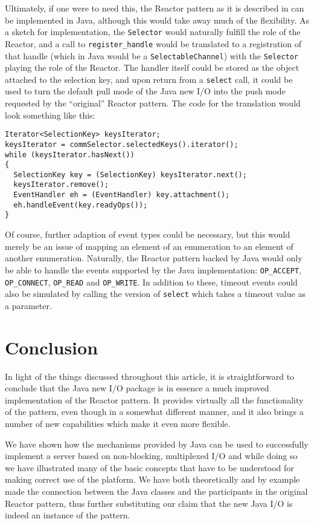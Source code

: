 \documentclass[a4paper,10pt]{article}
\begin{document}
Ultimately, if one were to need this, the Reactor pattern as it is described in \cite{218705} can be implemented
in Java, although this would take away much of the flexibility. As a sketch for implementation, the \texttt{Selector}
would naturally fulfill the role of the Reactor, and a call to \texttt{register\_handle} would be translated to a
registration of that handle (which in Java would be a \texttt{SelectableChannel}) with the \texttt{Selector}
playing the role of the Reactor. The handler itself could be stored as the object attached to the selection key,
and upon return from a \texttt{select} call, it could be used to turn the default pull mode of the Java new I/O
into the push mode requested by the ``original'' Reactor pattern. The code for the translation would look something
like this:

\begin{lstlisting}
Iterator<SelectionKey> keysIterator;
keysIterator = commSelector.selectedKeys().iterator();
while (keysIterator.hasNext())
{
  SelectionKey key = (SelectionKey) keysIterator.next();
  keysIterator.remove();
  EventHandler eh = (EventHandler) key.attachment();
  eh.handleEvent(key.readyOps());
}
\end{lstlisting}

Of course, further adaption of event types could be necessary, but this would merely be an issue of mapping an
element of an enumeration to an element of another enumeration. Naturally, the Reactor pattern backed by
Java would only be able to handle the events supported by the Java implementation: \texttt{OP\_ACCEPT},
\texttt{OP\_CONNECT}, \texttt{OP\_READ} and \texttt{OP\_WRITE}. In addition to these, timeout events
could also be simulated by calling the version of \texttt{select} which takes a timeout value as a parameter.

\section{Conclusion}
\label{conclusion}

In light of the things discussed throughout this article, it is straightforward to conclude that the Java new I/O
package is in essence a much improved implementation of the Reactor pattern. It provides virtually all the
functionality of the pattern, even though in a somewhat different manner, and it also brings a number of
new capabilities which make it even more flexible.

We have shown how the mechanisms provided by Java can be used to successfully implement a server
based on non-blocking, multiplexed I/O and while doing so we have illustrated many of the basic concepts
that have to be understood for making correct use of the platform. We have both theoretically and by example
made the connection between the Java classes and the participants in the original Reactor pattern, thus
further substituting our claim that the new Java I/O is indeed an instance of the pattern.
\end{document}
